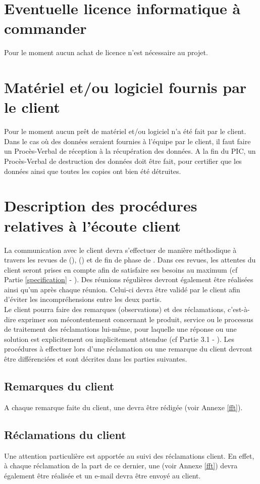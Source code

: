 \section{Eventuelle licence informatique à commander}
\label{Eventuelle licence informatique à commander}
\indent Pour le moment aucun achat de licence n'est nécessaire au projet.

\section{Matériel et/ou logiciel fournis par le client}
\label{Matériel et/ou logiciel fournis par le client}
\indent Pour le moment aucun prêt de matériel et/ou logiciel n'a été fait par le client.\\
\indent Dans le cas où des données seraient fournies à l’équipe \PICCourt par le client, il faut faire un Procès-Verbal de réception à la récupération des données. A la fin du PIC, un Procès-Verbal de destruction des données doit être fait, pour certifier que les données ainsi que toutes les copies ont bien été détruites.

\section{Description des procédures relatives à l'écoute client}
\label{DescrProceduresRelativesALecouteClient}
\indent La communication avec le client devra s'effectuer de manière méthodique à travers les revues de \DSI{} (\DSICourt), \DSE{} (\DSECourt) et de fin de phase de \PICCourt. Dans ces revues, les attentes du client seront prises en compte afin de satisfaire ses besoins au maximum (cf Partie \ref{specification} - \PQCourt). Des réunions régulières devront également être réalisées ainsi qu'un \CRC{} après chaque réunion. Celui-ci devra être validé par le client afin d'éviter les incompréhensions entre les deux partis. \\
Le client pourra faire des remarques (observations) et des réclamations, c'est-à-dire exprimer son mécontentement concernant le produit, service ou le processus de traitement des réclamations lui-même, pour laquelle une réponse ou une solution est explicitement ou implicitement attendue (cf Partie 3.1 - \MQ). 
Les procédures à effectuer lors d'une réclamation ou une remarque du client devront être différenciées et sont décrites dans les parties suivantes.
   
\subsection{Remarques du client}
\label{RqClient}
A chaque remarque faite du client, une \FFT{} devra être rédigée (voir Annexe \ref{fft}).

\subsection{Réclamations du client}
\label{ReclamClient}
Une attention particulière est apportée au suivi des réclamations client. En effet, à chaque réclamation de la part de ce dernier, une \FFT{} (voir Annexe \ref{fft}) devra également être réalisée et un e-mail devra être envoyé au client. 

